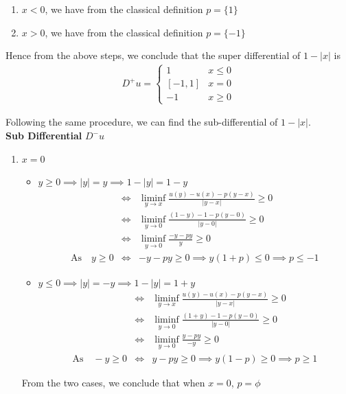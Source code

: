 \begin{example}
\begin{enumerate}
  \item $x < 0$, we have from the classical definition $p = \{1\}$

  \item $x > 0$, we have from the classical definition $p = \{-1\}$
  \end{enumerate}
  Hence from the above steps, we conclude that the super differential
  of $1-\lvert x \rvert$ is
  \begin{eqnarray}
    D^+u = \left\{
    \begin{array}{ll}
      1 & x \le 0\\
      \left[-1,1\right] & x = 0\\
      -1 & x\ge 0
    \end{array}
           \right.\label{eq:9}
  \end{eqnarray}

\noindent
Following the same procedure, we can find the sub-differential of $1-\lvert x \rvert$.\\

\noindent
\textbf{Sub Differential} $D^-u$
\begin{enumerate}
\item $x = 0$
  \begin{itemize}
  \item
    $y \ge 0 \implies \lvert y \rvert = y \implies 1 - \lvert y \rvert
    = 1 - y$
    \begin{eqnarray}
      &\iff&\liminf \limits_{y \to x} \frac{u(y)-u(x) - p(y-x)}{\lvert y -x \rvert} \ge 0\\
      &\iff& \liminf\limits_{y \to 0} \frac{(1-y)-1 - p(y-0)}{\lvert y -0 \rvert} \ge 0\\
      &\iff& \liminf \limits_{y \to 0} \frac{-y - py}{ y } \ge 0\\
      \text{As} \quad y \ge 0 &\iff& -y-py \ge 0 \implies y(1+p) \le 0 \nonumber
                                     \implies p \le -1
    \end{eqnarray}

  \item
    $y \le 0 \implies \lvert y \rvert = -y \implies 1 - \lvert y
    \rvert = 1 + y$
    \begin{eqnarray}
      &\iff&\liminf \limits_{y \to x} \frac{u(y)-u(x) - p(y-x)}{\lvert y -x \rvert} \ge 0\\
      &\iff& \liminf \limits_{y \to 0} \frac{(1+y)-1 - p(y-0)}{\lvert y -0 \rvert} \ge 0\\
      &\iff& \liminf \limits_{y \to 0} \frac{y - py}{ -y } \ge 0\\
      \text{As} \quad -y \ge 0 &\iff& y-py \ge 0 \implies y(1-p) \ge 0 \nonumber
                                      \implies p \ge 1
    \end{eqnarray}
  \end{itemize}
  From the two cases, we conclude that when $x=0$, $p = \phi$


\end{enumerate}
\end{example}
